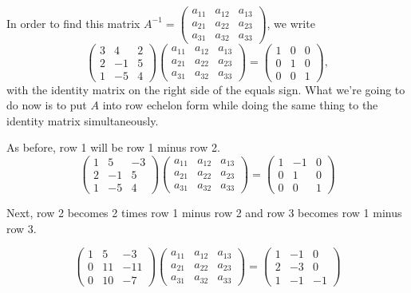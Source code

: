 \documentclass[
]{book}
\theoremstyle{definition}
\theoremstyle{definition}
\theoremstyle{definition}
\theoremstyle{definition}
\theoremstyle{remark}
\begin{document}
In order to find this matrix \(A^{-1} = \begin{pmatrix} a_{11} & a_{12} & a_{13}\\ a_{21} & a_{22} & a_{23}\\ a_{31} & a_{32} & a_{33}\end{pmatrix}\), we write \[ \begin{pmatrix}3 & 4 & 2\\ 2 & -1 & 5\\ 1 & -5 & 4 \end{pmatrix}\begin{pmatrix} a_{11} & a_{12} & a_{13}\\  a_{21} & a_{22} & a_{23}\\  a_{31} & a_{32} & a_{33}\end{pmatrix} = \begin{pmatrix}1 & 0 & 0\\ 0 & 1 & 0\\ 0 & 0 & 1 \end{pmatrix}, \] with the identity matrix on the right side of the equals sign. What we're going to do now is to put \(A\) into row echelon form while doing the same thing to the identity matrix simultaneously.

As before, row 1 will be row 1 minus row 2.
\[ \begin{pmatrix}1 & 5 & -3\\ 2 & -1 & 5\\ 1 & -5 & 4 \end{pmatrix}\begin{pmatrix} a_{11} & a_{12} & a_{13}\\  a_{21} & a_{22} & a_{23}\\  a_{31} & a_{32} & a_{33}\end{pmatrix} = \begin{pmatrix}1 & -1 & 0\\ 0 & 1 & 0\\ 0 & 0 & 1 \end{pmatrix}\]

Next, row 2 becomes 2 times row 1 minus row 2 and row 3 becomes row 1 minus row 3.

\[ \begin{pmatrix}1 & 5 & -3\\ 0 & 11 & -11\\ 0 & 10 & -7 \end{pmatrix}\begin{pmatrix} a_{11} & a_{12} & a_{13}\\  a_{21} & a_{22} & a_{23}\\  a_{31} & a_{32} & a_{33}\end{pmatrix} = \begin{pmatrix}1 & -1 & 0\\ 2 & -3 & 0\\ 1 & -1 & -1 \end{pmatrix}\]
\end{document}
